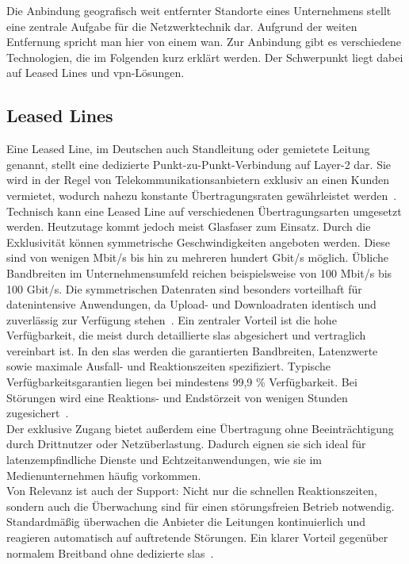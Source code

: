 
Die Anbindung geografisch weit entfernter Standorte eines Unternehmens stellt eine zentrale Aufgabe für die Netzwerktechnik dar. Aufgrund der weiten Entfernung spricht man hier von einem \acl{wan}. Zur Anbindung gibt es verschiedene Technologien, die im Folgenden kurz erklärt werden. Der Schwerpunkt liegt dabei auf Leased Lines und \ac{vpn}-Lösungen.

\subsection*{Leased Lines}
Eine Leased Line, im Deutschen auch Standleitung oder gemietete Leitung genannt, stellt eine dedizierte Punkt-zu-Punkt-Verbindung auf Layer-2 dar. Sie wird in der Regel von Telekommunikationsanbietern exklusiv an einen Kunden vermietet, wodurch nahezu konstante Übertragungsraten gewährleistet werden~\cite{WhatAreLeased}. \\
Technisch kann eine Leased Line auf verschiedenen Übertragungsarten umgesetzt werden. Heutzutage kommt jedoch meist Glasfaser zum Einsatz. Durch die Exklusivität können symmetrische Geschwindigkeiten angeboten werden. Diese sind von wenigen Mbit/s bis hin zu mehreren hundert Gbit/s möglich. Übliche Bandbreiten im Unternehmensumfeld reichen beispielsweise von 100 Mbit/s bis 100 Gbit/s. Die symmetrischen Datenraten sind besonders vorteilhaft für datenintensive Anwendungen, da Upload- und Downloadraten identisch und zuverlässig zur Verfügung stehen~\cite[7]{BuildingInfrastructureCapacity1999}. Ein zentraler Vorteil ist die hohe Verfügbarkeit, die meist durch detaillierte \acp{sla} abgesichert und vertraglich vereinbart ist. In den \acp{sla} werden die garantierten Bandbreiten, Latenzwerte sowie maximale Ausfall- und Reaktionszeiten spezifiziert. Typische Verfügbarkeitsgarantien liegen bei mindestens 99,9 \% Verfügbarkeit. Bei Störungen wird eine Reaktions- und Endstörzeit von wenigen Stunden zugesichert~\cite{wickStandleitungUndSDSL2016}.\\
Der exklusive Zugang bietet außerdem eine Übertragung ohne Beeinträchtigung durch Drittnutzer oder Netzüberlastung. Dadurch eignen sie sich ideal für latenzempfindliche Dienste und Echtzeitanwendungen, wie sie im Medienunternehmen häufig vorkommen.\\
Von Relevanz ist auch der Support: Nicht nur die schnellen Reaktionszeiten, sondern auch die Überwachung sind für einen störungsfreien Betrieb notwendig. Standardmäßig überwachen die Anbieter die Leitungen kontinuierlich und reagieren automatisch auf auftretende Störungen. Ein klarer Vorteil gegenüber normalem Breitband ohne dedizierte \acp{sla}~\cite[155]{parkNetworkDesignUsing2002}.\\
